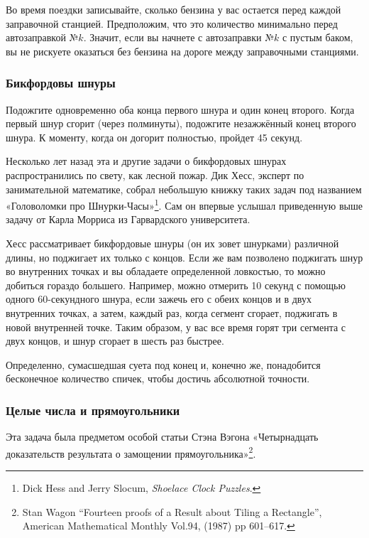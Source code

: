 Во время поездки записывайте, сколько бензина у вас остается перед каждой заправочной станцией. 
Предположим, что это количество минимально перед автозаправкой №$k$. 
Значит, если вы начнете с автозаправки №$k$ с пустым баком, вы не рискуете оказаться без бензина на дороге между заправочными станциями.\heart

\subsubsection*{Бикфордовы шнуры} %

Подожгите одновременно оба конца первого шнура и один конец второго. 
Когда первый шнур сгорит (через полминуты), подожгите незажжённый конец второго шнура.  
К моменту, когда он догорит полностью, пройдет 45 секунд.
\heart

Несколько лет назад эта и другие задачи о бикфордовых шнурах распространились по свету, как лесной пожар.
Дик Хесс, эксперт  по занимательной математике, 
собрал небольшую книжку таких задач 
под названием «Головоломки про Шнурки-Часы»\footnote{Dick Hess and Jerry Slocum, \emph{Shoelace Clock Puzzles}.}. 
Сам он впервые услышал приведенную выше задачу от Карла Морриса из Гарвардского университета.

Хесс рассматривает бикфордовые шнуры (он их зовет шнурками)  различной длины, но поджигает их только с концов.
Если же вам позволено поджигать шнур во внутренних точках и вы обладаете определенной ловкостью, то можно добиться гораздо большего. Например, можно отмерить 10 секунд с помощью одного 60-секундного шнура, если зажечь его с обеих концов и в двух внутренних точках, а затем, каждый раз, когда сегмент сгорает,  поджигать в новой  внутренней точке.
Таким образом, у вас все время горят  три сегмента  с двух концов,  и шнур сгорает в шесть раз быстрее.

Определенно, сумасшедшая суета под конец и, конечно же, понадобится бесконечное количество спичек, чтобы достичь абсолютной точности.






\subsubsection*{Целые числа и прямоугольники} %

Эта задача была предметом особой %
статьи Стэна Вэгона %
«Четырнадцать доказательств результата о замощении прямоугольника»\footnote{Stan Wagon “Fourteen proofs of a Result about Tiling a Rectangle”, American Mathematical Monthly  Vol.94, (1987) pp 601--617.}.


